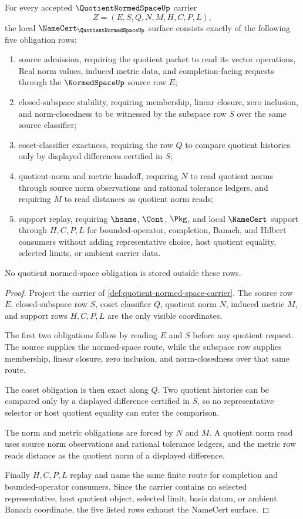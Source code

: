 \begin{theorem}
\label{thm:quotient-normed-space-namecert-obligations}
For every accepted $\QuotientNormedSpaceUp$ carrier
$$
Z=(E,S,Q,N,M,H,C,P,L),
$$
the local $\NameCert_{\QuotientNormedSpaceUp}$ surface consists exactly of the following five obligation rows:
\begin{enumerate}
\item source admission, requiring the quotient packet to read its vector operations, Real norm values, induced metric data, and completion-facing requests through the $\NormedSpaceUp$ source row $E$;
\item closed-subspace stability, requiring membership, linear closure, zero inclusion, and norm-closedness to be witnessed by the subspace row $S$ over the same source classifier;
\item coset-classifier exactness, requiring the row $Q$ to compare quotient histories only by displayed differences certified in $S$;
\item quotient-norm and metric handoff, requiring $N$ to read quotient norms through source norm observations and rational tolerance ledgers, and requiring $M$ to read distances as quotient norm reads;
\item support replay, requiring $\hsame$, $\Cont$, $\Pkg$, and local $\NameCert$ support through $H,C,P,L$ for bounded-operator, completion, Banach, and Hilbert consumers without adding representative choice, host quotient equality, selected limits, or ambient carrier data.
\end{enumerate}
No quotient normed-space obligation is stored outside these rows.
\end{theorem}
\begin{proof}
Project the carrier of \autoref{def:quotient-normed-space-carrier}. The source row $E$, closed-subspace row $S$, coset classifier $Q$, quotient norm $N$, induced metric $M$, and support rows $H,C,P,L$ are the only visible coordinates.

The first two obligations follow by reading $E$ and $S$ before any quotient request. The source supplies the normed-space route, while the subspace row supplies membership, linear closure, zero inclusion, and norm-closedness over that same route.

The coset obligation is then exact along $Q$. Two quotient histories can be compared only by a displayed difference certified in $S$, so no representative selector or host quotient equality can enter the comparison.

The norm and metric obligations are forced by $N$ and $M$. A quotient norm read uses source norm observations and rational tolerance ledgers, and the metric row reads distance as the quotient norm of a displayed difference.

Finally $H,C,P,L$ replay and name the same finite route for completion and bounded-operator consumers. Since the carrier contains no selected representative, host quotient object, selected limit, basis datum, or ambient Banach coordinate, the five listed rows exhaust the NameCert surface.
\end{proof}

